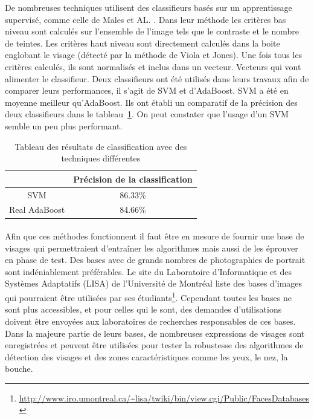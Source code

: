 \documentclass[11pt, french,screen]{report-rd-info}
\begin{document}
De nombreuses techniques utilisent des classifieurs basés sur un apprentissage supervisé, comme celle de Males et AL. \cite{Males2013}. Dans leur méthode les critères bas niveau sont calculés sur l’ensemble de l’image tels que le contraste et le nombre de teintes. Les critères haut niveau sont directement calculés dans la boite englobant le visage (détecté par la méthode de Viola et Jones). Une fois tous les critères calculés, ils sont normalisés et inclus dans un vecteur. Vecteurs qui vont alimenter le classifieur. Deux classifieurs ont été utilisés dans leurs travaux afin de comparer leurs performances, il s’agit de SVM et d’AdaBoost. SVM a été en moyenne meilleur qu’AdaBoost. Ils ont établi un comparatif de la précision des deux classifieurs dans le tableau~\ref{tab:ComparaisonSVMAdaBoost}. On peut constater que l'usage d'un SVM semble un peu plus performant.
\begin{table}
\begin{center}
\begin{tabular}{|c|c|}
\hline
& Précision de la classification \\
\hline
SVM & 86.33\% \\
\hline
Real AdaBoost & 84.66\% \\
\hline
\end{tabular}
\end{center}
\caption{Tableau des résultats de classification avec des techniques différentes \cite{Males2013}}
\label{tab:ComparaisonSVMAdaBoost}
\end{table}
\paragraph*{}
Afin que ces méthodes fonctionnent il faut être en mesure de fournir une base de visages qui permettraient d'entraîner les algorithmes mais aussi de les éprouver en phase de test.
Des bases avec de grands nombres de photographies de portrait sont indéniablement préférables. Le site du Laboratoire d'Informatique et des Systèmes Adaptatifs (LISA) de l'Université de Montréal liste des bases d'images qui pourraient être utilisées par ses étudiants\footnote{\url{http://www.iro.umontreal.ca/~lisa/twiki/bin/view.cgi/Public/FacesDatabases}}. Cependant toutes les bases ne sont plus accessibles, et pour celles qui le sont, des demandes d'utilisations doivent être envoyées aux laboratoires de recherches responsables de ces bases. Dans la majeure partie de leurs bases, de nombreuses expressions de visages sont enregistrées et peuvent être utilisées pour tester la robustesse des algorithmes de détection des visages et des zones caractéristiques comme les yeux, le nez, la bouche.
\end{document}
